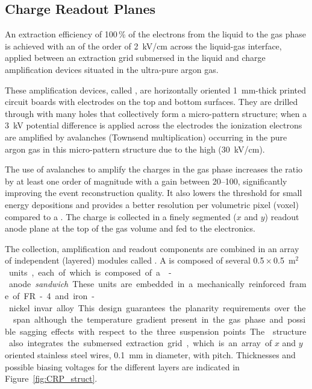 \subsection{Charge Readout Planes}
\label{v4:fddp-ov:crp}

An extraction efficiency of \num{100}\,\% of the electrons from the liquid to the gas phase is achieved with an \efield of the order of \SI{2}{kV/cm} across the liquid-gas interface, applied between an  extraction grid submersed in the liquid and charge amplification  devices situated in the ultra-pure argon gas. 

These amplification devices, called , are horizontally  oriented \SI{1}{mm}-thick printed  circuit boards with electrodes on the top and bottom surfaces. They are drilled through with many holes that collectively form a micro-pattern structure;  when a \SI{3}{kV} potential difference is applied across the electrodes the ionization electrons are amplified by avalanches (Townsend multiplication) occurring in the  pure argon gas in this micro-pattern structure due to the high \efield (\SI{30}{kV/cm}).

The use of avalanches to amplify the charges in the gas phase increases the  ratio by at least one order of magnitude with a  gain between \numrange{20}{100}, significantly improving the event reconstruction quality. It also lowers the threshold for small energy depositions and provides a better resolution per volumetric pixel (voxel) compared to a \single \lartpc.  The charge is collected in a finely segmented \twod ($x$ and $y$) readout anode plane at the top of the gas volume and fed to the  electronics.   

The  collection, amplification and readout components are combined in an array of independent (layered) modules called . A  is  composed of several \num{0.5}\,$\times$\,\SI{0.5}{m$^2$} units, each of which is composed  of a -anode \textit{sandwich}.  These units are embedded in a mechanically reinforced frame of FR-4 and iron-nickel invar alloy. This design guarantees the planarity requirements over the  span although the temperature gradient present in the gas phase and possible sagging effects with respect to the three suspension points. The  structure also integrates  the submersed extraction grid, which is an array of $x$ and $y$ oriented stainless steel wires, \SI{0.1}{mm} in diameter, with \dpstrippitch pitch. Thicknesses and possible biasing voltages for the different layers are indicated in Figure~\ref{fig:CRP_struct}.

